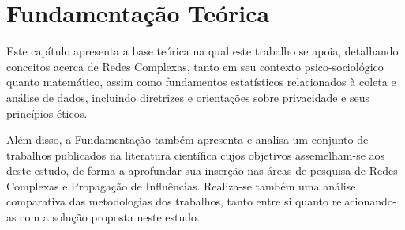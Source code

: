 \chapter{Fundamentação Teórica} \label{sec:theory}

Este capítulo apresenta a base teórica na qual este trabalho se apoia, detalhando conceitos acerca de Redes Complexas, tanto em seu contexto psico-sociológico quanto matemático, assim como fundamentos estatísticos relacionados à coleta e análise de dados, incluindo diretrizes e orientações sobre privacidade e seus princípios éticos.

Além disso, a Fundamentação também apresenta e analisa um conjunto de trabalhos publicados na literatura científica cujos objetivos assemelham-se aos deste estudo, de forma a aprofundar sua inserção nas áreas de pesquisa de Redes Complexas e Propagação de Influências. Realiza-se também uma análise comparativa das metodologias dos trabalhos, tanto entre si quanto relacionando-as com a solução proposta neste estudo.


%
%



 